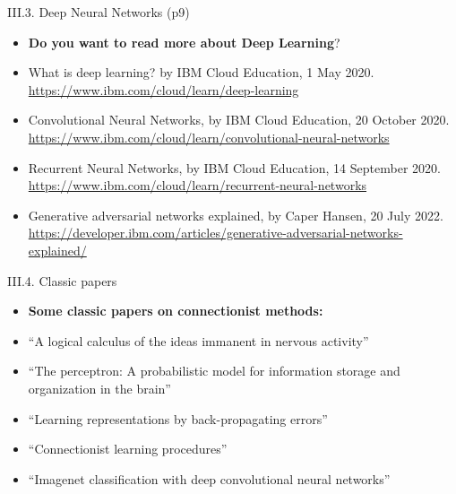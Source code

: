 \documentclass[handout]{beamer}
\begin{document}
\begin{frame}{III.3. Deep Neural Networks (p9)}
\begin{itemize}
\item[] \textbf{Do you want to read more about Deep Learning}?
%
\item What is deep learning?
by IBM Cloud Education, 1 May 2020.
\url{https://www.ibm.com/cloud/learn/deep-learning}\\
%
\item Convolutional Neural Networks,
by IBM Cloud Education, 20 October 2020.
\url{https://www.ibm.com/cloud/learn/convolutional-neural-networks}\\
%
\item Recurrent Neural Networks,
by IBM Cloud Education, 14 September 2020.
\url{https://www.ibm.com/cloud/learn/recurrent-neural-networks}
%
\item Generative adversarial networks explained,
by Caper Hansen, 20 July 2022.
\url{https://developer.ibm.com/articles/generative-adversarial-networks-explained/}\\
\end{itemize}
\end{frame}
\begin{frame}{III.4. Classic papers}
\begin{itemize}
%
\item[] \textbf{Some classic papers on connectionist methods:}
%
\item ``A logical calculus of the ideas immanent in nervous activity''~\cite{mcculloch-pitts:1943}
%
\item ``The perceptron: A probabilistic model for information storage and organization in the brain''~\cite{rosenblatt:1958}
%
\item ``Learning representations by back-propagating errors''~\cite{rumelhart-et-al:1986}
%
\item ``Connectionist learning procedures''~\cite{hinton:1989}
%
\item ``Imagenet classification with deep convolutional neural networks''~\cite{krizhevsky-et-al-cacm:2017}
%
\end{itemize}
\end{frame}
\end{document}
